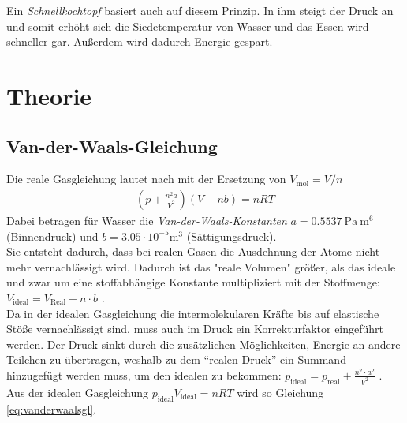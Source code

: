\documentclass[12pt,a4paper,titlepage,headinclude,bibtotoc]{scrartcl}
\begin{document}
Ein \textit{Schnellkochtopf} basiert auch auf diesem Prinzip.
In ihm steigt der Druck an und somit erhöht sich die Siedetemperatur von Wasser und das Essen wird schneller gar.
Außerdem wird dadurch Energie gespart. 

\section{Theorie}
\label{sec:theorie}

\subsection{Van-der-Waals-Gleichung}
Die reale Gasgleichung lautet nach \cite[S. 303]{gerthsen} mit der Ersetzung von $V_\text{mol}=V/n$ 
\begin{align}
	\left(p+\frac{n^2a}{V^2}\right)\left( V-nb \right)=nRT \label{eq:vanderwaalsgl}
\end{align}
Dabei betragen für Wasser die \emph{Van-der-Waals-Konstanten} $a=0.5537~\si{\pascal~\meter^6}$ (Binnendruck) und $b=3.05\cdot10^{-5}\si{\meter^3}$ (Sättigungsdruck).\\
Sie entsteht dadurch, dass bei realen Gasen die Ausdehnung der Atome nicht mehr vernachlässigt wird.
Dadurch ist das "reale Volumen" größer, als das ideale und zwar um eine stoffabhängige Konstante multipliziert mit der Stoffmenge: $V_\text{ideal}=V_\text{Real}-n\cdot b$ .\\
Da in der idealen Gasgleichung die intermolekularen Kräfte bis auf elastische Stöße vernachlässigt sind, muss auch im Druck ein Korrekturfaktor eingeführt werden.
Der Druck sinkt durch die zusätzlichen Möglichkeiten, Energie an andere Teilchen zu übertragen, weshalb zu dem ``realen Druck'' ein Summand hinzugefügt werden muss, um den idealen zu bekommen: $p_\text{ideal}=p_\text{real}+\frac{n^2\cdot a^2}{V^2}$ .
Aus der idealen Gasgleichung $p_\text{ideal}V_\text{ideal}=nRT$ wird so Gleichung \eqref{eq:vanderwaalsgl}.
\end{document}
